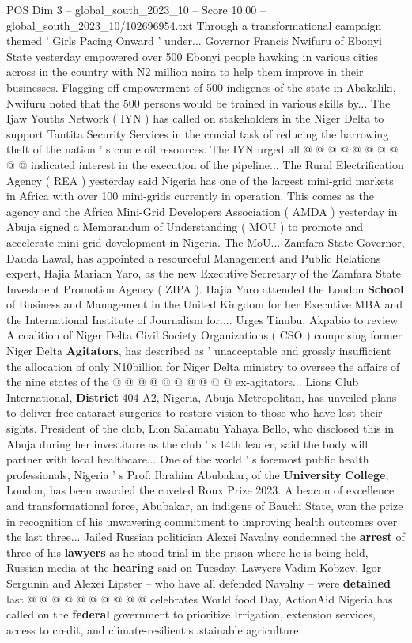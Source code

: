 \begin{textsample}{POS Dim 3 – global\_south\_2023\_10 – Score 10.00 – global\_south\_2023\_10/102696954.txt}
Through a transformational campaign themed ' Girls Pacing Onward ' under...
Governor Francis Nwifuru of Ebonyi State yesterday empowered over 500 Ebonyi people hawking in various cities across in the country with N2 million naira to help them improve in their businesses.
Flagging off empowerment of 500 indigenes of the state in Abakaliki, Nwifuru noted that the 500 persons would be trained in various skills by...
The Ijaw Youths Network ( IYN ) has called on stakeholders in the Niger Delta to support Tantita Security Services in the crucial task of reducing the harrowing theft of the nation ' s crude oil resources.
The IYN urged all @ @ @ @ @ @ @ @ @ @ indicated interest in the execution of the pipeline...
The Rural Electrification Agency ( REA ) yesterday said Nigeria has one of the largest mini-grid markets in Africa with over 100 mini-grids currently in operation.
This comes as the agency and the Africa Mini-Grid Developers Association ( AMDA ) yesterday in Abuja signed a Memorandum of Understanding ( MOU ) to promote and accelerate mini-grid development in Nigeria.
The MoU...
Zamfara State Governor, Dauda Lawal, has appointed a resourceful Management and Public Relations expert, Hajia Mariam Yaro, as the new Executive Secretary of the Zamfara State Investment Promotion Agency ( ZIPA ).
Hajia Yaro attended the London \textbf{School} of Business and Management in the United Kingdom for her Executive MBA and the International Institute of Journalism for....
Urges Tinubu, Akpabio to review A coalition of Niger Delta Civil Society Organizations ( CSO ) comprising former Niger Delta \textbf{Agitators}, has described as ' unacceptable and grossly insufficient the allocation of only N10billion for Niger Delta ministry to oversee the affairs of the nine states of the @ @ @ @ @ @ @ @ @ @ ex-agitators...
Lions Club International, \textbf{District} 404-A2, Nigeria, Abuja Metropolitan, has unveiled plans to deliver free cataract surgeries to restore vision to those who have lost their sights.
President of the club, Lion Salamatu Yahaya Bello, who disclosed this in Abuja during her investiture as the club ' s 14th leader, said the body will partner with local healthcare...
One of the world ' s foremost public health professionals, Nigeria ' s Prof.
Ibrahim Abubakar, of the \textbf{University} \textbf{College}, London, has been awarded the coveted Roux Prize 2023.
A beacon of excellence and transformational force, Abubakar, an indigene of Bauchi State, won the prize in recognition of his unwavering commitment to improving health outcomes over the last three...
Jailed Russian politician Alexei Navalny condemned the \textbf{arrest} of three of his \textbf{lawyers} as he stood trial in the prison where he is being held, Russian media at the \textbf{hearing} said on Tuesday.
Lawyers Vadim Kobzev, Igor Sergunin and Alexei Lipster -- who have all defended Navalny -- were \textbf{detained} last @ @ @ @ @ @ @ @ @ @ celebrates World food Day, ActionAid Nigeria has called on the \textbf{federal} government to prioritize Irrigation, extension services, access to credit, and climate-resilient sustainable agriculture


\end{textsample}
